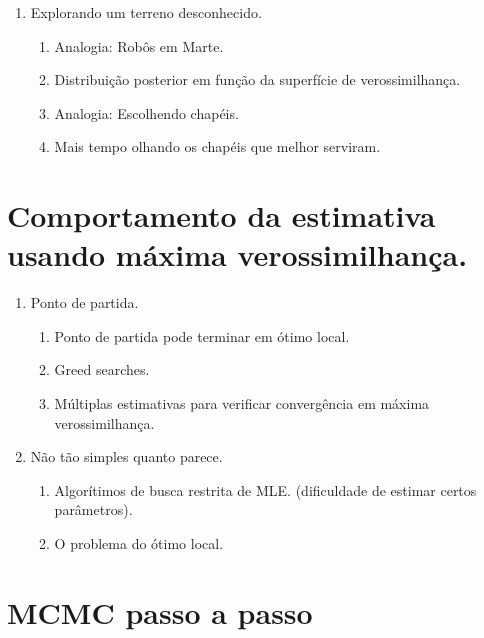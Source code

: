 \documentclass[10pt,a4paper]{article}
\begin{document}
\begin{enumerate}
\item Explorando um terreno desconhecido.
	\begin{enumerate}
	\item Analogia: Robôs em Marte.
	\item Distribuição posterior em função da superfície de verossimilhança.
	\item Analogia: Escolhendo chapéis.
	\item Mais tempo olhando os chapéis que melhor serviram.
	\end{enumerate}
\end{enumerate}

\section{Comportamento da estimativa usando máxima verossimilhança.}

\begin{enumerate}
\item Ponto de partida.
	\begin{enumerate}
	\item Ponto de partida pode terminar em ótimo local.
	\item Greed searches.
	\item Múltiplas estimativas para verificar convergência em máxima verossimilhança.	
	\end{enumerate}
	
\item Não tão simples quanto parece.
	\begin{enumerate}
	\item Algorítimos de busca restrita de MLE. (dificuldade de estimar certos parâmetros).
	\item O problema do ótimo local.
	\end{enumerate}
\end{enumerate}

\section{MCMC passo a passo}
\end{document}
